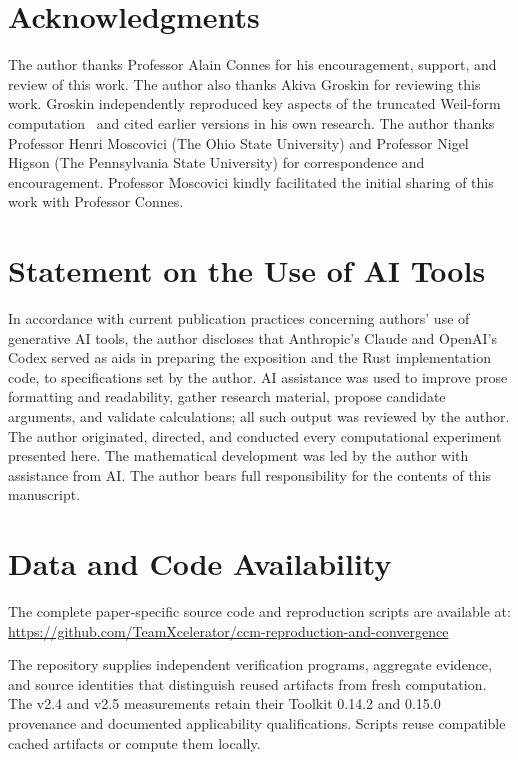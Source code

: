 \documentclass[11pt,a4paper]{article}
\begin{document}
\section*{Acknowledgments}

The author thanks Professor Alain Connes for his encouragement,
support, and review of this work. The author also thanks Akiva Groskin
for reviewing this work. Groskin independently reproduced key aspects
of the truncated Weil-form computation~\cite{Groskin2026HighPrecision}
and cited earlier versions in his own research. The author thanks
Professor Henri Moscovici (The Ohio State University) and Professor
Nigel Higson (The Pennsylvania State University) for correspondence
and encouragement. Professor Moscovici kindly facilitated the initial
sharing of this work with Professor Connes.

\section*{Statement on the Use of AI Tools}

In accordance with current publication practices concerning authors'
use of generative AI tools, the author discloses that Anthropic's
Claude and OpenAI's Codex served as aids in preparing the exposition
and the Rust implementation code, to specifications set by the author.
AI assistance was used to improve prose formatting and readability,
gather research material, propose candidate arguments, and validate
calculations; all such output was reviewed by the author. The author
originated, directed, and conducted every computational experiment
presented here. The mathematical development was led by the author
with assistance from AI. The author bears full responsibility for the
contents of this manuscript.

\section*{Data and Code Availability}

The complete paper-specific source code and reproduction scripts are
available at:\\
{\small\url{https://github.com/TeamXcelerator/ccm-reproduction-and-convergence}}

\noindent The repository supplies independent verification programs,
aggregate evidence, and source identities that distinguish reused artifacts
from fresh computation. The v2.4 and v2.5 measurements retain their Toolkit
0.14.2 and 0.15.0 provenance and documented applicability qualifications.
Scripts reuse compatible cached artifacts or compute them locally.
\end{document}
